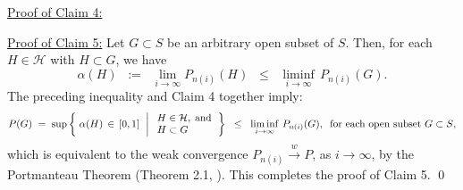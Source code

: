 \vskip 0.5cm
\noindent
\underline{Proof of Claim 4:}\quad

\vskip 0.5cm
\noindent
\underline{Proof of Claim 5:}\quad
Let $G \subset S$ be an arbitrary open subset of $S$.
Then, for each $H \in \mathcal{H}$ with $H \subset G$, we have
\begin{equation*}
\alpha(H)
\;\; := \;\; \lim_{i\rightarrow\infty}P_{n(i)}(H)
\;\; \leq \;\; \liminf_{i\rightarrow\infty}\,P_{n(i)}(G).
\end{equation*}
The preceding inequality and Claim 4 together imply:
\begin{equation*}
P(G)
\; = \;
\sup\left\{\;
\alpha(H) \,\in\, [0,1]
\,\;\left\vert\;
\begin{array}{l} H \in \mathcal{H}, \;\textnormal{and} \\ H \subset G \end{array}
\right.
\right\}
\;\;\leq\;\;
\liminf_{i\rightarrow\infty}\,P_{n(i)}(G),
\;\;
\textnormal{for each open subset $G \subset S$},
\end{equation*}
which is equivalent to the weak convergence
$P_{n(i)} \overset{w}{\longrightarrow} P$, as $i \longrightarrow \infty$,
by the Portmanteau Theorem (Theorem 2.1, \cite{Billingsley1999}).
This completes the proof of Claim 5.
\qed

\renewcommand{\theenumi}{\roman{enumi}}
\renewcommand{\labelenumi}{\textnormal{(\theenumi)}$\;\;$}

